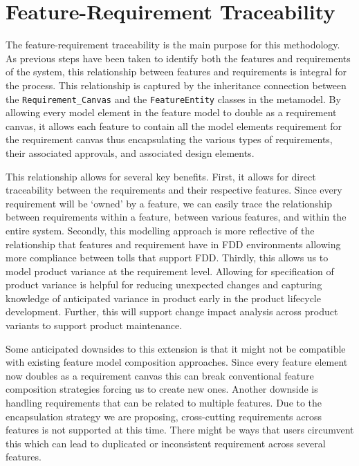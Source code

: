 \section{Feature-Requirement Traceability}

The feature-requirement traceability is the main purpose for this methodology. As previous steps have been taken to identify both the features and requirements of the system, this relationship between features and requirements is integral for the process. This relationship is captured by the inheritance connection between the \texttt{Requirement\_Canvas} and the \texttt{FeatureEntity} classes in the metamodel. By allowing every model element in the feature model to double as a requirement canvas, it allows each feature to contain all the model elements requirement for the requirement canvas thus encapsulating the various types of requirements, their associated approvals, and associated design elements.

This relationship allows for several key benefits. First, it allows for direct traceability between the requirements and their respective features. Since every requirement will be `owned' by a feature, we can easily trace the relationship between requirements within a feature, between various features, and within the entire system. Secondly, this modelling approach is more reflective of the relationship that features and requirement have in \ac{FDD} environments allowing more compliance between tolls that support \ac{FDD}. Thirdly, this allows us to model product variance at the requirement level. Allowing for specification of product variance is helpful for reducing unexpected changes and capturing knowledge of anticipated variance in product early in the product lifecycle development. Further, this will support change impact analysis across product variants to support product maintenance. 

Some anticipated downsides to this extension is that it might not be compatible with existing feature model composition approaches. Since every feature element now doubles as a requirement canvas this can break conventional feature composition strategies forcing us to create new ones. Another downside is handling requirements that can be related to multiple features. Due to the encapsulation strategy we are proposing, cross-cutting requirements across features is not supported at this time. There might be ways that users circumvent this which can lead to duplicated or inconsistent requirement across several features. 

